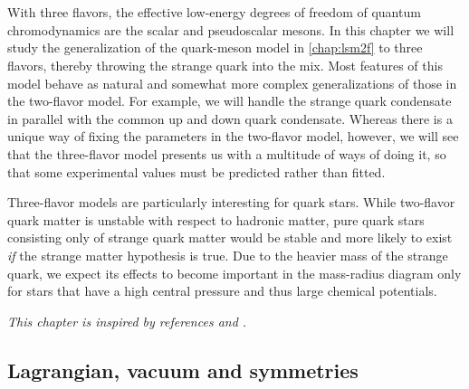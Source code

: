 \chapter{\texorpdfstring{}{The Three-Flavor Quark-Meson Model}}
\label{chap:lsm3f}

With three flavors, the effective low-energy degrees of freedom of quantum chromodynamics are the scalar and pseudoscalar mesons. %
In this chapter we will study the generalization of the quark-meson model in \cref{chap:lsm2f} to three flavors,
thereby throwing the strange quark into the mix.
Most features of this model behave as natural and somewhat more complex generalizations of those in the two-flavor model.
For example, we will handle the strange quark condensate in parallel with the common up and down quark condensate.
Whereas there is a unique way of fixing the parameters in the two-flavor model, however,
we will see that the three-flavor model presents us with a multitude of ways of doing it,
so that some experimental values must be predicted rather than fitted.

Three-flavor models are particularly interesting for quark stars.
While two-flavor quark matter is unstable with respect to hadronic matter,
pure quark stars consisting only of strange quark matter would be stable and more likely to exist
\emph{if} the strange matter hypothesis is true.
Due to the heavier mass of the strange quark,
we expect its effects to become important in the mass-radius diagram
only for stars that have a high central pressure and thus large chemical potentials.

\textit{This chapter is inspired by references \cite{ref:lsm3f} and \cite{ref:lsm3f_details}.}

\section{Lagrangian, vacuum and symmetries}

